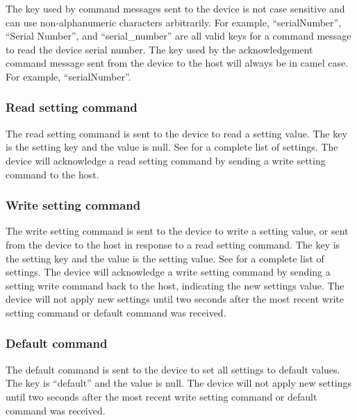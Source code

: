 The key used by command messages sent to the device is not case sensitive and can use non-alphanumeric characters arbitrarily.  For example, \enquote{serialNumber}, \enquote{Serial Number}, and \enquote{serial\_number} are all valid keys for a command message to read the device serial number.  The key used by the acknowledgement command message sent from the device to the host will always be in camel case. For example, \enquote{serialNumber}.

\subsubsection{Read setting command}

The read setting command is sent to the device to read a setting value.  The key is the setting key and the value is null.  See  for a complete list of settings.  The device will acknowledge a read setting command by sending a write setting command to the host.


\subsubsection{Write setting command}

The write setting command is sent to the device to write a setting value, or sent from the device to the host in response to a read setting command.  The key is the setting key and the value is the setting value.  See  for a complete list of settings.  The device will acknowledge a write setting command by sending a setting write command back to the host, indicating the new settings value.  The device will not apply new settings until two seconds after the most recent write setting command or default command was received.


\subsubsection{Default command}

The default command is sent to the device to set all settings to default values.  The key is \enquote{default} and the value is null.  The device will not apply new settings until two seconds after the most recent write setting command or default command was received.

